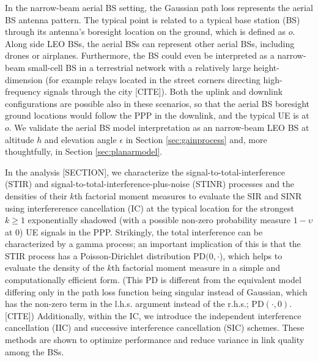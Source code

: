 \documentclass[lettersize,journal]{IEEEtran}
\begin{document}
In the narrow-beam aerial BS setting, the Gaussian path loss represents the aerial BS antenna pattern. The typical point is related to a typical base station (BS) through its antenna's boresight location on the ground, which is defined as $\textit{o}$. Along side LEO BSs, the aerial BSs can represent other aerial BSs, including drones or airplanes. Furthermore, the BS could even be interpreted as a narrow-beam small-cell BS in a terrestrial network with a relatively large height-dimension (for example relays located in the street corners directing high-frequency signals through the city [CITE]). Both the uplink and downlink configurations are possible also in these scenarios, so that the aerial BS boresight ground locations would follow the PPP in the downlink, and the typical UE is at $\textit{o}$. We validate the aerial BS model interpretation as an narrow-beam LEO BS at altitude $h$ and elevation angle $\epsilon$ in Section \ref{sec:gainprocess} and, more thoughtfully, in Section \ref{sec:planarmodel}.







In the analysis [SECTION], we characterize the signal-to-total-interference (STIR) and signal-to-total-interference-plus-noise (STINR) processes and the densities of their $k$th factorial moment measures to evaluate the SIR and SINR using interfererence cancellation (IC) at the typical location for the strongest $k \geq 1$ exponentially shadowed (with a possible non-zero probability measure $1-\upsilon$ at $0$) UE signals in the PPP. Strikingly, the total interference can be characterized by a gamma process; an important implication of this is that the STIR process has a Poisson-Dirichlet distribution PD$(0,\cdot$), which helps to evaluate the density of the $k$th factorial moment measure in a simple and computationally efficient form. (This PD is different from the equivalent model differing only in the path loss function being singular instead of Gaussian, which has the non-zero term in the l.h.s. argument instead of the r.h.s.; PD$(\cdot,0)$. [CITE]) Additionally, within the IC, we introduce the independent interference cancellation (IIC) and successive interference cancellation (SIC) schemes. These methods are shown to optimize performance and reduce variance in link quality among the BSs.
\end{document}
